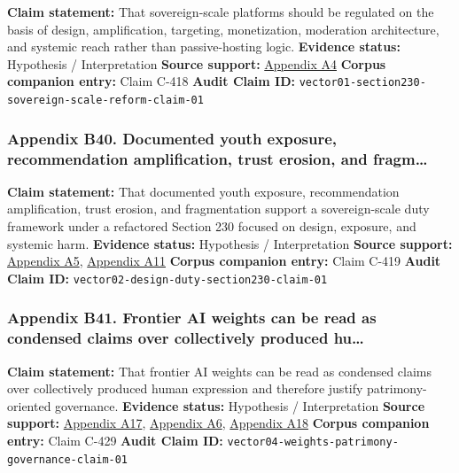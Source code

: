 \documentclass[
  american,
  11pt,
  letterpaper,
]{article}
\begin{document}
\textbf{Claim statement:} That sovereign-scale platforms should be
regulated on the basis of design, amplification, targeting,
monetization, moderation architecture, and systemic reach rather than
passive-hosting logic. \textbf{Evidence status:} Hypothesis /
Interpretation \textbf{Source support:}
\hyperref[ch-10-appendix-a4-a-look-behind-the-screens-examining-the-data-practices-of-social-media-and-video-streaming-services]{Appendix
A4} \textbf{Corpus companion entry:} Claim C-418 \textbf{Audit Claim
ID:} \texttt{vector01-section230-sovereign-scale-reform-claim-01}

\subsubsection{Appendix B40. Documented youth exposure, recommendation
amplification, trust erosion, and
fragm\ldots{}}\label{ch-10-appendix-b40-documented-youth-exposure-recommendation-amplification-trust-erosion-and-fragm}

\textbf{Claim statement:} That documented youth exposure, recommendation
amplification, trust erosion, and fragmentation support a
sovereign-scale duty framework under a refactored Section 230 focused on
design, exposure, and systemic harm. \textbf{Evidence status:}
Hypothesis / Interpretation \textbf{Source support:}
\hyperref[ch-10-appendix-a5-social-media-and-youth-mental-health-the-u-s-surgeon-general-s-advisory]{Appendix
A5},
\hyperref[ch-10-appendix-a11-social-media-seen-as-mostly-good-for-democracy-across-many-nations-but-u-s-is-a-major-outlier]{Appendix
A11} \textbf{Corpus companion entry:} Claim C-419 \textbf{Audit Claim
ID:} \texttt{vector02-design-duty-section230-claim-01}

\subsubsection{Appendix B41. Frontier AI weights can be read as
condensed claims over collectively produced
hu\ldots{}}\label{ch-10-appendix-b41-frontier-ai-weights-can-be-read-as-condensed-claims-over-collectively-produced-hu}

\textbf{Claim statement:} That frontier AI weights can be read as
condensed claims over collectively produced human expression and
therefore justify patrimony-oriented governance. \textbf{Evidence
status:} Hypothesis / Interpretation \textbf{Source support:}
\hyperref[ch-10-appendix-a17-ai-copyright-weights-a-new-frontier-in-intellectual-property-law]{Appendix
A17},
\hyperref[ch-10-appendix-a6-copyright-and-artificial-intelligence-part-3-generative-ai-training-pre-publication-version]{Appendix
A6},
\hyperref[ch-10-appendix-a18-bipartisan-house-task-force-report-on-artificial-intelligence]{Appendix
A18} \textbf{Corpus companion entry:} Claim C-429 \textbf{Audit Claim
ID:} \texttt{vector04-weights-patrimony-governance-claim-01}
\end{document}
